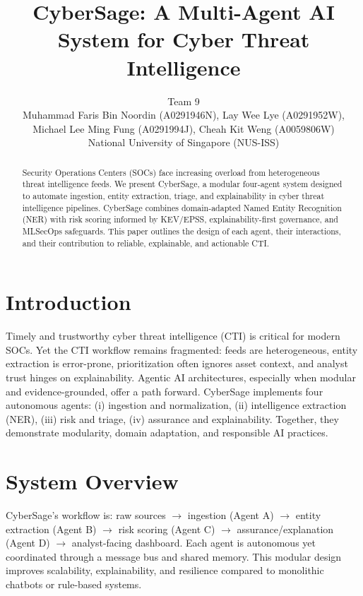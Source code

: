 \documentclass[11pt,conference]{IEEEtran}
\title{CyberSage: A Multi-Agent AI System for Cyber Threat Intelligence}
\author{
  Team 9 \\
  Muhammad Faris Bin Noordin (A0291946N), 
  Lay Wee Lye (A0291952W), \\
  Michael Lee Ming Fung (A0291994J), 
  Cheah Kit Weng (A0059806W) \\
  National University of Singapore (NUS-ISS) \\
}
\begin{document}
\maketitle

\begin{abstract}
Security Operations Centers (SOCs) face increasing overload from heterogeneous threat intelligence feeds.
We present CyberSage, a modular four-agent system designed to automate ingestion, entity extraction, triage, and explainability in cyber threat intelligence pipelines.
CyberSage combines domain-adapted Named Entity Recognition (NER) with risk scoring informed by KEV/EPSS, explainability-first governance, and MLSecOps safeguards.
This paper outlines the design of each agent, their interactions, and their contribution to reliable, explainable, and actionable CTI.
\end{abstract}

\section{Introduction}
Timely and trustworthy cyber threat intelligence (CTI) is critical for modern SOCs.
Yet the CTI workflow remains fragmented: feeds are heterogeneous, entity extraction is error-prone, prioritization often ignores asset context, and analyst trust hinges on explainability.
Agentic AI architectures, especially when modular and evidence-grounded, offer a path forward.
CyberSage implements four autonomous agents:
(i) ingestion and normalization,
(ii) intelligence extraction (NER),
(iii) risk and triage,
(iv) assurance and explainability.
Together, they demonstrate modularity, domain adaptation, and responsible AI practices.

\section{System Overview}
CyberSage’s workflow is: raw sources $\rightarrow$ ingestion (Agent A) $\rightarrow$ entity extraction (Agent B) $\rightarrow$ risk scoring (Agent C) $\rightarrow$ assurance/explanation (Agent D) $\rightarrow$ analyst-facing dashboard.
Each agent is autonomous yet coordinated through a message bus and shared memory.
This modular design improves scalability, explainability, and resilience compared to monolithic chatbots or rule-based systems.

\end{document}
